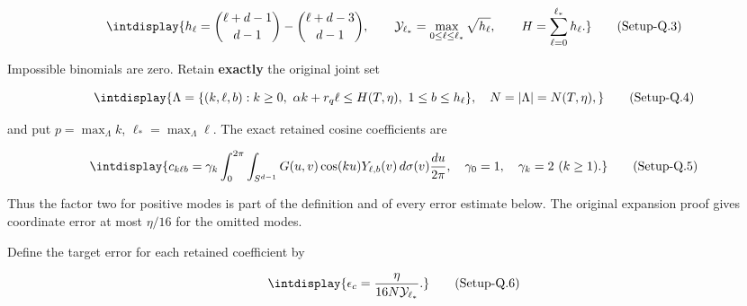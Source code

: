 \label{int:eq-setup-q-3}
\begingroup\renewcommand{\theHequation}{intdisplay.871}
\begin{equation}
\intdisplay{
h_\ell=\binom{\ell+d-1}{d-1}-\binom{\ell+d-3}{d-1},\qquad
\mathcal Y_{\ell_*}=\max_{0\le\ell\le \ell_*}\sqrt{h_\ell},\qquad
H=\sum_{\ell=0}^{\ell_*} h_\ell.
}
\tag{Setup-Q.3}
\label{int:eq-0424-setup-q-3}
\end{equation}
\endgroup


Impossible binomials are zero. Retain \textbf{exactly} the original joint set


\label{int:eq-setup-q-4}
\begingroup\renewcommand{\theHequation}{intdisplay.872}
\begin{equation}
\intdisplay{
\Lambda=\{(k,\ell,b):k\ge0,\ \alpha k+r_q\ell\le H(T,\eta),
\ 1\le b\le h_\ell\},
\quad N=|\Lambda|=N(T,\eta),
}
\tag{Setup-Q.4}
\label{int:eq-0425-setup-q-4}
\end{equation}
\endgroup


and put \(p=\max_\Lambda k\), \(\ell_*=\max_\Lambda\ell\). The exact retained cosine coefficients are


\label{int:eq-setup-q-5}
\begingroup\renewcommand{\theHequation}{intdisplay.873}
\begin{equation}
\intdisplay{
c_{k\ell b}
=\gamma_k\int_0^{2\pi}\int_{S^{d-1}}
G(u,v)\cos(ku)Y_{\ell,b}(v)\,d\sigma(v)\frac{du}{2\pi},
\quad \gamma_0=1,\quad\gamma_k=2\ (k\ge1).
}
\tag{Setup-Q.5}
\label{int:eq-0426-setup-q-5}
\end{equation}
\endgroup


Thus the factor two for positive modes is part of the definition and of every error estimate below. The original expansion proof gives coordinate error at most \(\eta/16\) for the omitted modes.



Define the target error for each retained coefficient by


\label{int:eq-setup-q-6}
\begingroup\renewcommand{\theHequation}{intdisplay.874}
\begin{equation}
\intdisplay{
\epsilon_c=\frac{\eta}{16N\mathcal Y_{\ell_*}}.
}
\tag{Setup-Q.6}
\label{int:eq-0427-setup-q-6}
\end{equation}
\endgroup

